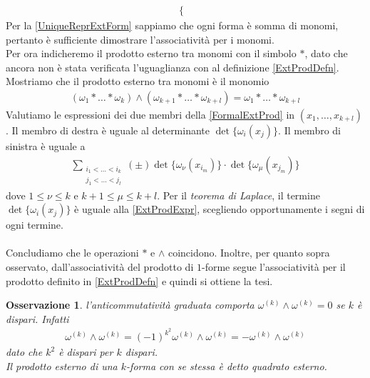 \documentclass[twoside, 11pt]{amsbook}
\makeatletter
\newcommand{\0}{{(0)}}
\newcommand{\3}{{(3)}}
\theoremstyle{colonplain}
\theoremstyle{colondefinition}
\theoremstyle{colonremark}
\newtheorem{rmk}[thm]{Osservazione}
\numberwithin{equation}{chapter}
\renewcommand{\proofname}{Dimostrazione}
\renewenvironment{proof}[1][\proofname]{\par
  \pushQED{\qed}%
  \normalfont \topsep6\p@\@plus6\p@\relax
  \trivlist
  \item[\hskip\labelsep\bfseries #1:]\ignorespaces
}{%
  \popQED\endtrivlist\@endpefalse
}
\makeatother
\begin{document}
\begin{proof}
\begin{align}
\begin{cases}
    \end{cases} 
\end{align}
Per la \ref{UniqueReprExtForm} sappiamo che ogni forma è somma di monomi, pertanto è sufficiente dimostrare l'associatività per i monomi. \\
Per ora indicheremo il prodotto esterno tra monomi con il simbolo $*$, dato che ancora non è stata verificata l'uguaglianza con al definizione \eqref{ExtProdDefn}. \\
Mostriamo che il prodotto esterno tra monomi è il monomio 
\begin{align}\label{FormalExtProd}
    (\omega_1 * \dots * \omega_k) \wedge (\omega_{k + 1} * \dots * \omega_{k + l}) = \omega_1 * \dots * \omega_{k + l} 
\end{align}
Valutiamo le espressioni dei due membri della \eqref{FormalExtProd} in $(x_1, \dots, x_{k + l})$. Il membro di destra è uguale al determinante $\det\{\omega_i(x_j)\}$. Il membro di sinistra è uguale a 
\begin{align}\label{ExtProdExpr}
    \sum_{\substack{i_1 < \dots < i_k \\ j_1 < \dots < j_l}} (\pm) \det\{\omega_\nu(x_{i_m})\} \cdot \det\{\omega_\mu(x_{j_m})\} 
\end{align}
dove $1 \leq \nu \leq k$ e $k + 1 \leq \mu \leq k + l$. Per il \textit{teorema di Laplace}, il termine $\det\{\omega_i(x_j)\}$ è uguale alla \eqref{ExtProdExpr}, scegliendo opportunamente i segni di ogni termine. \\ \\
Concludiamo che le operazioni $*$ e $\wedge$ coincidono. Inoltre, per quanto sopra osservato, dall'associatività del prodotto di $1$-forme segue l'associatività per il prodotto definito in \eqref{ExtProdDefn} e quindi si ottiene la tesi.
\end{proof}
\begin{rmk} l'anticommutatività graduata comporta $\omega^{(k)} \wedge \omega^{(k)} = 0$ se $k$ è dispari. Infatti
\begin{align}
    \omega^{(k)} \wedge \omega^{(k)} = (-1)^{k^2}\omega^{(k)} \wedge \omega^{(k)} = -\omega^{(k)} \wedge \omega^{(k)} 
\end{align}
dato che $k^2$ è dispari per $k$ dispari. \\
Il prodotto esterno di una $k$-forma con se stessa è detto \textit{quadrato esterno}.
\end{rmk}
\end{document}
